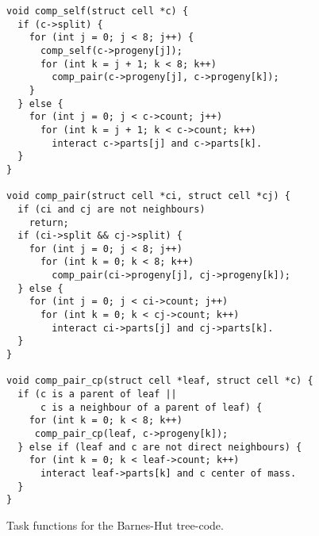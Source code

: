 \documentclass[preprint]{elsarticle}
\begin{document}
\begin{figure}
\begin{center}\begin{minipage}{0.9\textwidth}
    \begin{lstlisting}[basicstyle=\scriptsize\tt]
void comp_self(struct cell *c) {
  if (c->split) {
    for (int j = 0; j < 8; j++) {
      comp_self(c->progeny[j]);
      for (int k = j + 1; k < 8; k++)
        comp_pair(c->progeny[j], c->progeny[k]);
    }
  } else {
    for (int j = 0; j < c->count; j++)
      for (int k = j + 1; k < c->count; k++)
        interact c->parts[j] and c->parts[k].
  }
}

void comp_pair(struct cell *ci, struct cell *cj) {
  if (ci and cj are not neighbours)
    return;
  if (ci->split && cj->split) {
    for (int j = 0; j < 8; j++)
      for (int k = 0; k < 8; k++)
        comp_pair(ci->progeny[j], cj->progeny[k]);
  } else {
    for (int j = 0; j < ci->count; j++)
      for (int k = 0; k < cj->count; k++)
        interact ci->parts[j] and cj->parts[k].
  }
}

void comp_pair_cp(struct cell *leaf, struct cell *c) {
  if (c is a parent of leaf ||
      c is a neighbour of a parent of leaf) {
    for (int k = 0; k < 8; k++)
     comp_pair_cp(leaf, c->progeny[k]);
  } else if (leaf and c are not direct neighbours) {
    for (int k = 0; k < leaf->count; k++)
      interact leaf->parts[k] and c center of mass.
  }
}
    \end{lstlisting}
\end{minipage}\end{center}
    \caption{Task functions for the Barnes-Hut tree-code.}
    \label{fig:BHTasks}
\end{figure}
\end{document}
